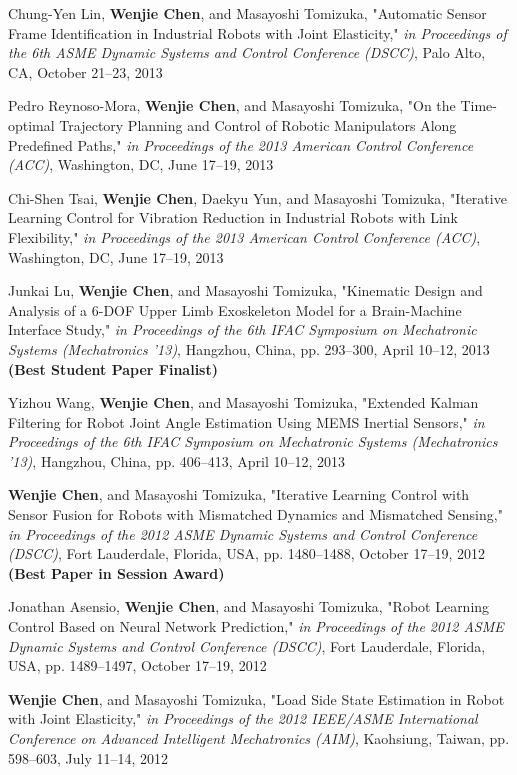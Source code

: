 \documentclass{res}
\begin{document}
\begin{resume}
\begin{etaremune}[start=26]
    \item Chung-Yen Lin, \textbf{Wenjie Chen}, and Masayoshi Tomizuka, "Automatic Sensor Frame Identification in Industrial Robots with Joint Elasticity," \emph{in Proceedings of the 6th ASME Dynamic Systems and Control Conference (DSCC)}, Palo Alto, CA, October 21--23, 2013
    \item Pedro Reynoso-Mora, \textbf{Wenjie Chen}, and Masayoshi Tomizuka, "On the Time-optimal Trajectory Planning and Control of Robotic Manipulators Along Predefined Paths," \emph{in Proceedings of the 2013 American Control Conference (ACC)}, Washington, DC, June 17--19, 2013
    \item Chi-Shen Tsai, \textbf{Wenjie Chen}, Daekyu Yun, and Masayoshi Tomizuka, "Iterative Learning Control for Vibration Reduction in Industrial Robots with Link Flexibility," \emph{in Proceedings of the 2013 American Control Conference (ACC)}, Washington, DC, June 17--19, 2013
    \item Junkai Lu, \textbf{Wenjie Chen}, and Masayoshi Tomizuka, "Kinematic Design and Analysis of a 6-DOF Upper Limb Exoskeleton Model for a Brain-Machine Interface Study," \emph{in Proceedings of the 6th IFAC Symposium on Mechatronic Systems (Mechatronics '13)}, Hangzhou, China, pp. 293--300, April 10--12, 2013 \textbf{(Best Student Paper Finalist)}
    \item Yizhou Wang, \textbf{Wenjie Chen}, and Masayoshi Tomizuka, "Extended Kalman Filtering for Robot Joint Angle Estimation Using MEMS Inertial Sensors,"  \emph{in Proceedings of the 6th IFAC Symposium on Mechatronic Systems (Mechatronics '13)}, Hangzhou, China, pp. 406--413, April 10--12, 2013
    \item \textbf{Wenjie Chen}, and Masayoshi Tomizuka, "Iterative Learning Control with Sensor Fusion for Robots with Mismatched Dynamics and Mismatched Sensing," \emph{in Proceedings of the 2012 ASME Dynamic Systems and Control Conference (DSCC)}, Fort Lauderdale, Florida, USA, pp. 1480--1488, October 17--19, 2012 \textbf{(Best Paper in Session Award)}
    \item Jonathan Asensio, \textbf{Wenjie Chen}, and Masayoshi Tomizuka, "Robot Learning Control Based on Neural Network Prediction," \emph{in Proceedings of the 2012 ASME Dynamic Systems and Control Conference (DSCC)}, Fort Lauderdale, Florida, USA, pp. 1489--1497, October 17--19, 2012
    \item \textbf{Wenjie Chen}, and Masayoshi Tomizuka, "Load Side State Estimation in Robot with Joint Elasticity," \emph{in Proceedings of the 2012 IEEE/ASME International Conference on Advanced Intelligent Mechatronics (AIM)}, Kaohsiung, Taiwan, pp. 598--603, July 11--14, 2012

\end{etaremune}
\end{resume}
\end{document}
